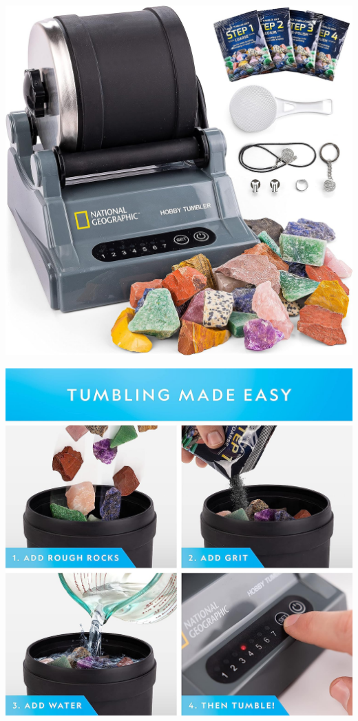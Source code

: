 \documentclass{beamer}
\begin{document}
\begin{frame}{}
	\centering
	\includegraphics[scale=.15]{images/gem-tumbler-01}
\end{frame}

\begin{frame}{}
	\centering
	\includegraphics[scale=.15]{images/gem-tumbler-02}
\end{frame}
\end{document}
